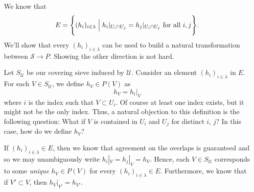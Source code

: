 \begin{prf}
    We know that 
    \[
        E = \Bigg\{(h_i)_{i \in \lambda} \Bigm\vert h_i|_{U_i \cap U_j} = h_j|_{U_i \cap U_j} \text{ for all } i, j \Bigg\}.
    \]
    We'll show that every $(h_i)_{i \in \lambda}$ can be used to build 
    a natural transformation between $\mathcal{S} \to P$. Showing the other direction 
    is not hard.

    Let $S_{\mathcal{U}}$ be our covering sieve induced by $\mathcal{U}$.
    Consider an element $(h_i)_{i \in \lambda}$ in $E$. For each $V \in S_{\mathcal{U}}$, 
    we define $h_V \in P(V)$ as
    \[
        h_V = h_i|_{V}
    \]
    where $i$ is the index such that $V \subset U_i$. Of course at least one index exists, 
    but it might not be the only index. Thus, a natural objection to this definition is the following 
    question: What if $V$ is contained in $U_i$ and $U_j$ for distinct $i$, $j$? 
    In this case, how do we define $h_V$?
    
    \begin{center}
    \end{center}
    If $(h_i)_{i \in \lambda} \in E$, then we know that 
    agreement on the overlaps is guaranteed and so we may unambiguously 
    write $h_i|_V = h_j|_V = h_V$. 
    Hence, each $V \in S_{\mathcal{U}}$ corresponds to some \emph{unique} $h_V \in P(V)$
    for every $(h_i)_{i \in \lambda} \in E$. Furthermore, 
    we know that if $V' \subset V$, then $h_V|_{V'} = h_{V'}$.
    

\end{prf}

